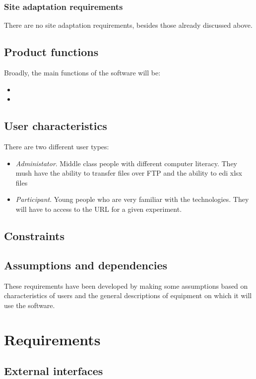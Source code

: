 \documentclass[a4paper,12pt,oneside]{report}
\begin{document}
\subsection{Site adaptation requirements}
There are no site adaptation requirements, besides those already discussed above.

\section{Product functions}
Broadly, the main functions of the software will be:
\begin{itemize}
\item
\item
\end{itemize}
\section{User characteristics}
There are two different user types:
\begin{itemize}
	\item {\it Administator}. Middle class people with different computer literacy. They mush have the ability to transfer files over FTP and the ability to edi xlsx files
	\item {\it Participant}. Young people who are very familiar with the technologies. They will have to access to the URL for a given experiment.
\end{itemize}

\section{Constraints}
\section{Assumptions and dependencies}
These requirements have been developed by making some assumptions based on characteristics of users and the general descriptions of equipment on which it will use the software. %
 \chapter {Requirements}
\section{External interfaces}
\end{document}
